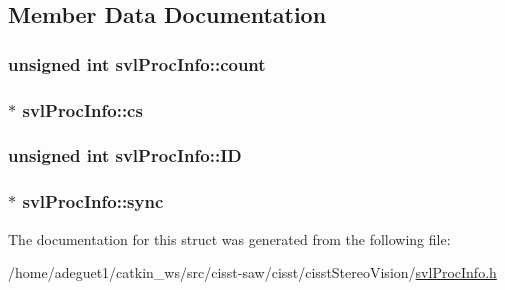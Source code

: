 \subsection{Member Data Documentation}
\hypertarget{structsvl_proc_info_a4cced89ad8330495e631543a5e2b71ad}{
\subsubsection[{count}]{\setlength{\rightskip}{0pt plus 5cm}unsigned int svl\-Proc\-Info\-::count}}\label{structsvl_proc_info_a4cced89ad8330495e631543a5e2b71ad}
\hypertarget{structsvl_proc_info_ac899e1383645cebefa007101ecd9b68b}{
\subsubsection[{cs}]{$\ast$ svl\-Proc\-Info\-::cs}}\label{structsvl_proc_info_ac899e1383645cebefa007101ecd9b68b}
\hypertarget{structsvl_proc_info_afc6f44188d8eb0d790d5355880323830}{
\subsubsection[{I\-D}]{\setlength{\rightskip}{0pt plus 5cm}unsigned int svl\-Proc\-Info\-::\-I\-D}}\label{structsvl_proc_info_afc6f44188d8eb0d790d5355880323830}
\hypertarget{structsvl_proc_info_a43238972bbbf3b4d82e9a28e1c8fd410}{
\subsubsection[{sync}]{$\ast$ svl\-Proc\-Info\-::sync}}\label{structsvl_proc_info_a43238972bbbf3b4d82e9a28e1c8fd410}


The documentation for this struct was generated from the following file\-:\begin{DoxyCompactItemize}
\item 
/home/adeguet1/catkin\-\_\-ws/src/cisst-\/saw/cisst/cisst\-Stereo\-Vision/\hyperlink{svl_proc_info_8h}{svl\-Proc\-Info.\-h}\end{DoxyCompactItemize}
